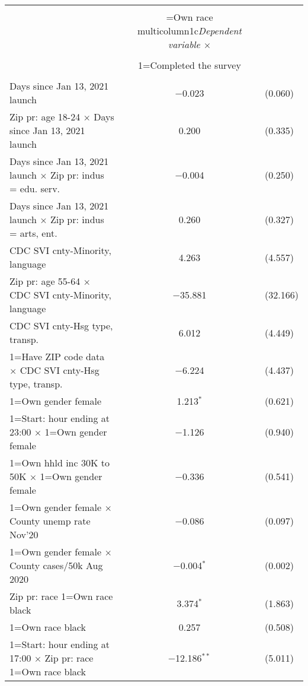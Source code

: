 
\begin{table}[!htbp] \centering 
  \caption{} 
  \label{} 
\begin{tabular}{@{\extracolsep{5pt}}lc} 
\\[-1.8ex]\hline 
\hline \\[-1.8ex] 
 & \1=Own race multicolumn{1}{c}{\textit{Dependent variable $\times$ }} \\ 
\\[-1.8ex] & 1=Completed the survey \\ 
\hline \\[-1.8ex] 
 Days since Jan 13, 2021 launch & $-$0.023 & (0.060) \\ 
  Zip pr: age 18-24 $\times$ Days since Jan 13, 2021 launch & 0.200 & (0.335) \\ 
  Days since Jan 13, 2021 launch $\times$ Zip pr: indus = edu. serv. & $-$0.004 & (0.250) \\ 
  Days since Jan 13, 2021 launch $\times$ Zip pr: indus = arts, ent. & 0.260 & (0.327) \\ 
  CDC SVI cnty-Minority, language & 4.263 & (4.557) \\ 
  Zip pr: age 55-64 $\times$ CDC SVI cnty-Minority, language & $-$35.881 & (32.166) \\ 
  CDC SVI cnty-Hsg type, transp. & 6.012 & (4.449) \\ 
  1=Have ZIP code data $\times$ CDC SVI cnty-Hsg type, transp. & $-$6.224 & (4.437) \\ 
  1=Own gender female & 1.213$^{*}$ & (0.621) \\ 
  1=Start: hour ending at 23:00 $\times$ 1=Own gender female & $-$1.126 & (0.940) \\ 
  1=Own hhld inc 30K to 50K $\times$ 1=Own gender female & $-$0.336 & (0.541) \\ 
  1=Own gender female $\times$ County unemp rate Nov'20 & $-$0.086 & (0.097) \\ 
  1=Own gender female $\times$ County cases/50k Aug 2020 & $-$0.004$^{*}$ & (0.002) \\ 
  Zip pr: race 1=Own race black & 3.374$^{*}$ & (1.863) \\ 
  1=Own race black & 0.257 & (0.508) \\ 
  1=Start: hour ending at 17:00 $\times$ Zip pr: race 1=Own race black & $-$12.186$^{**}$ & (5.011) \\ 

\end{tabular}
\end{table}
